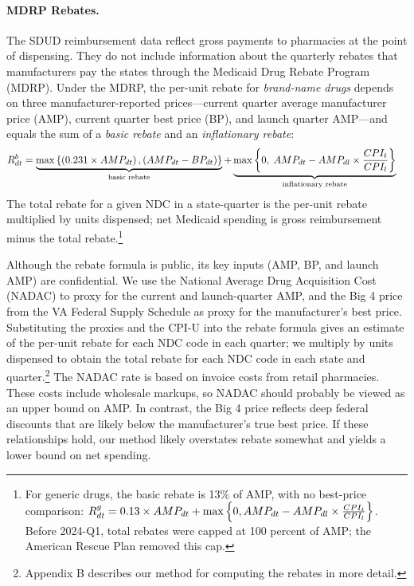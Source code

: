 \paragraph{MDRP Rebates.} The SDUD reimbursement data reflect gross payments to pharmacies at the point of dispensing. They do not include information about the quarterly rebates that manufacturers pay the states through the Medicaid Drug Rebate Program (MDRP). Under the MDRP, the per-unit rebate for \emph{brand-name drugs} depends on three manufacturer-reported prices---current quarter average manufacturer price (AMP), current quarter best price (BP), and launch quarter AMP---and equals the sum of a \emph{basic rebate} and an \emph{inflationary rebate}:
%
\begin{align*}
R_{dt}^{b} &= \underbrace{\max\bc{\bp{0.231 \times AMP_{dt}},\bp{AMP_{dt} - BP_{dt}}}}_{\text{basic rebate}} + \underbrace{\max\bc{0,\; AMP_{dt} - AMP_{dl} \times \frac{CPI_t}{CPI_l}}}_{\text{inflationary rebate}}
\end{align*}
%
The total rebate for a given NDC in a state-quarter is the per-unit rebate multiplied by units dispensed; net Medicaid spending is gross reimbursement minus the total rebate.\footnote{For generic drugs, the basic rebate is 13\% of AMP, with no best-price comparison: $R_{dt}^{g} = 0.13 \times AMP_{dt} + \max\bc{0, AMP_{dt} - AMP_{dl} \times \frac{CPI_t}{CPI_{l}}}$. Before 2024-Q1, total rebates were capped at 100 percent of AMP; the American Rescue Plan removed this cap.}  

Although the rebate formula is public, its key inputs (AMP, BP, and launch AMP) are confidential. We use the National Average Drug Acquisition Cost (NADAC) to proxy for the current and launch-quarter AMP, and the Big 4 price from the VA Federal Supply Schedule as proxy for the manufacturer's best price. Substituting the proxies and the CPI-U into the rebate formula gives an estimate of the per-unit rebate for each NDC code in each quarter; we multiply by units dispensed to obtain the total rebate for each NDC code in each state and quarter.\footnote{Appendix B describes our method for computing the rebates in more detail.} The NADAC rate is based on invoice costs from retail pharmacies. These costs include wholesale markups, so NADAC should probably be viewed as an upper bound on AMP. In contrast, the Big 4 price reflects deep federal discounts that are likely below the manufacturer's true best price. If these relationships hold, our method likely overstates rebate somewhat and yields a lower bound on net spending.

